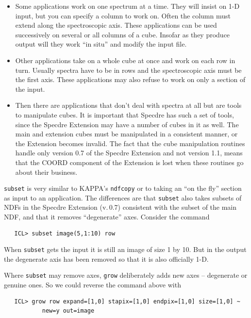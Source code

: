 \documentclass[11pt,twoside]{article}
\newcommand{\htmlref}[2]{#1}
\newcommand{\xref}[3]{#1}
\begin{document}
\begin{itemize}
\item Some applications work on one spectrum at a time.  They will
   insist on 1-D input, but you can specify a column to work on.  Often
   the column must extend along the spectroscopic axis.  These
   applications can be used successively on several or all columns of a
   cube.  Insofar as they produce output will they work ``in situ'' and
   modify the input file.

\item Other applications take on a whole cube at once and work on each
   row in turn.  Usually spectra have to be in rows and the
   spectroscopic axis must be the first axis.  These applications may
   also refuse to work on only a section of the input.

\item Then there are applications that don't deal with spectra at all
   but are tools to manipulate cubes.  It is important that Specdre has
   such a set of tools, since the Specdre Extension may have a number of
   cubes in it as well.  The main and extension cubes must be
   manipulated in a consistent manner, or the Extension becomes invalid.
   The fact that the cube manipulation routines handle only version 0.7
   of the Specdre Extension and not version 1.1, means that the COORD
   component of the Extension is lost when these routines go about their
   business.
\end{itemize}

{\tt\htmlref{subset}{SUBSET}}
   is very similar to KAPPA's
{\tt\xref{ndfcopy}{sun95}{NDFCOPY}}
   or to taking an ``on the fly'' section as input to an application.
   The differences are that {\tt subset} also takes subsets of NDFs in
   the Specdre Extension (v.\,0.7) consistent with the subset of the
   main NDF, and that it removes ``degenerate'' axes.  Consider the
   command

\begin{verbatim}
   ICL> subset image(5,1:10) row
\end{verbatim}

   When {\tt subset} gets the input it is still an image of size 1 by
   10.  But in the output the degenerate axis has been removed so that
   it is also officially 1-D.

   Where {\tt subset} may remove axes,
{\tt\htmlref{grow}{GROW}}
   deliberately adds new axes -- degenerate or genuine ones.  So we
   could reverse the command above with

\begin{verbatim}
   ICL> grow row expand=[1,0] stapix=[1,0] endpix=[1,0] size=[1,0] ~
           new=y out=image
\end{verbatim}
\end{document}
